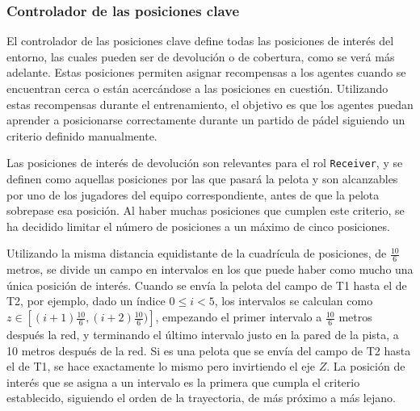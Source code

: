 \subsubsection{Controlador de las posiciones clave}

El controlador de las posiciones clave define todas las posiciones de interés del entorno, las cuales pueden ser de devolución o de cobertura, como se verá más adelante. Estas posiciones permiten asignar recompensas a los agentes cuando se encuentran cerca o están acercándose a las posiciones en cuestión. Utilizando estas recompensas durante el entrenamiento, el objetivo es que los agentes puedan aprender a posicionarse correctamente durante un partido de pádel siguiendo un criterio definido manualmente.

\newpage

Las posiciones de interés de devolución son relevantes para el rol \texttt{Receiver}, y se definen como aquellas posiciones por las que pasará la pelota y son alcanzables por uno de los jugadores del equipo correspondiente, antes de que la pelota sobrepase esa posición. Al haber muchas posiciones que cumplen este criterio, se ha decidido limitar el número de posiciones a un máximo de cinco posiciones.

Utilizando la misma distancia equidistante de la cuadrícula de posiciones, de $\frac{10}{6}$ metros, se divide un campo en intervalos en los que puede haber como mucho una única posición de interés. Cuando se envía la pelota del campo de T1 hasta el de T2, por ejemplo, dado un índice $0 \leq i < 5$, los intervalos se calculan como $z \in [(i + 1) \frac{10}{6}, (i + 2)\frac{10}{6})]$, empezando el primer intervalo a $\frac{10}{6}$ metros después la red, y terminando el último intervalo justo en la pared de la pista, a 10 metros después de la red. Si es una pelota que se envía del campo de T2 hasta el de T1, se hace exactamente lo mismo pero invirtiendo el eje $Z$. La posición de interés que se asigna a un intervalo es la primera que cumpla el criterio establecido, siguiendo el orden de la trayectoria, de más próximo a más lejano.

